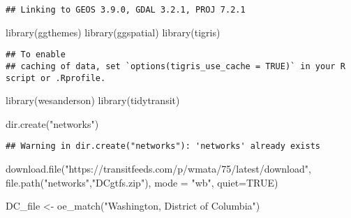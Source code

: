 \documentclass[
]{article}
\newenvironment{Shaded}{\begin{snugshade}}{\end{snugshade}}
\newcommand{\AttributeTok}[1]{\textcolor[rgb]{0.77,0.63,0.00}{#1}}
\newcommand{\ConstantTok}[1]{\textcolor[rgb]{0.00,0.00,0.00}{#1}}
\newcommand{\FunctionTok}[1]{\textcolor[rgb]{0.00,0.00,0.00}{#1}}
\newcommand{\NormalTok}[1]{#1}
\newcommand{\OtherTok}[1]{\textcolor[rgb]{0.56,0.35,0.01}{#1}}
\newcommand{\StringTok}[1]{\textcolor[rgb]{0.31,0.60,0.02}{#1}}
\begin{document}
\begin{verbatim}
## Linking to GEOS 3.9.0, GDAL 3.2.1, PROJ 7.2.1
\end{verbatim}

\begin{Shaded}
\begin{Highlighting}[]
\FunctionTok{library}\NormalTok{(ggthemes)}
\FunctionTok{library}\NormalTok{(ggspatial)}
\FunctionTok{library}\NormalTok{(tigris)}
\end{Highlighting}
\end{Shaded}

\begin{verbatim}
## To enable 
## caching of data, set `options(tigris_use_cache = TRUE)` in your R script or .Rprofile.
\end{verbatim}

\begin{Shaded}
\begin{Highlighting}[]
\FunctionTok{library}\NormalTok{(wesanderson)}
\FunctionTok{library}\NormalTok{(tidytransit)}
\end{Highlighting}
\end{Shaded}

\begin{Shaded}
\begin{Highlighting}[]
\FunctionTok{dir.create}\NormalTok{(}\StringTok{"networks"}\NormalTok{)}
\end{Highlighting}
\end{Shaded}

\begin{verbatim}
## Warning in dir.create("networks"): 'networks' already exists
\end{verbatim}

\begin{Shaded}
\begin{Highlighting}[]
\FunctionTok{download.file}\NormalTok{(}\StringTok{"https://transitfeeds.com/p/wmata/75/latest/download"}\NormalTok{, }\FunctionTok{file.path}\NormalTok{(}\StringTok{"networks"}\NormalTok{,}\StringTok{"DCgtfs.zip"}\NormalTok{), }\AttributeTok{mode =} \StringTok{"wb"}\NormalTok{, }\AttributeTok{quiet=}\ConstantTok{TRUE}\NormalTok{)}
\end{Highlighting}
\end{Shaded}

\begin{Shaded}
\begin{Highlighting}[]
\NormalTok{DC\_file }\OtherTok{\textless{}{-}} \FunctionTok{oe\_match}\NormalTok{(}\StringTok{"Washington, District of Columbia"}\NormalTok{)}
\end{Highlighting}
\end{Shaded}
\end{document}
